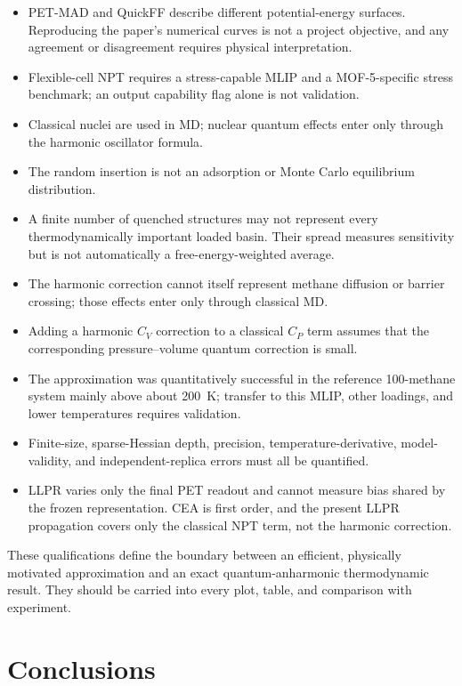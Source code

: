 \documentclass[10pt,a4paper,twocolumn]{article}
\newcommand{\cv}{\ensuremath{C_V}}
\newcommand{\cpheat}{\ensuremath{C_P}}
\begin{document}
\begin{itemize}
  \item PET-MAD and QuickFF describe different potential-energy surfaces.
        Reproducing the paper's numerical curves is not a project objective,
        and any agreement or disagreement requires physical interpretation.
  \item Flexible-cell NPT requires a stress-capable MLIP and a MOF-5-specific
        stress benchmark; an output capability flag alone is not validation.
  \item Classical nuclei are used in MD; nuclear quantum effects enter only
        through the harmonic oscillator formula.
  \item The random insertion is not an adsorption or Monte Carlo equilibrium
        distribution.
  \item A finite number of quenched structures may not represent every
        thermodynamically important loaded basin. Their spread measures
        sensitivity but is not automatically a free-energy-weighted average.
  \item The harmonic correction cannot itself represent methane diffusion or
        barrier crossing; those effects enter only through classical MD.
  \item Adding a harmonic \cv{} correction to a classical \cpheat{} term assumes
        that the corresponding pressure--volume quantum correction is small.
  \item The approximation was quantitatively successful in the reference
        100-methane system mainly above about \SI{200}{K}; transfer to this
        MLIP, other loadings, and lower temperatures requires validation.
  \item Finite-size, sparse-Hessian depth, precision, temperature-derivative,
        model-validity, and independent-replica errors must all be quantified.
  \item LLPR varies only the final PET readout and cannot measure bias shared by
        the frozen representation. CEA is first order, and the present LLPR
        propagation covers only the classical NPT term, not the harmonic
        correction.
\end{itemize}

These qualifications define the boundary between an efficient, physically
motivated approximation and an exact quantum-anharmonic thermodynamic result.
They should be carried into every plot, table, and comparison with experiment.

\section{Conclusions}
\end{document}

